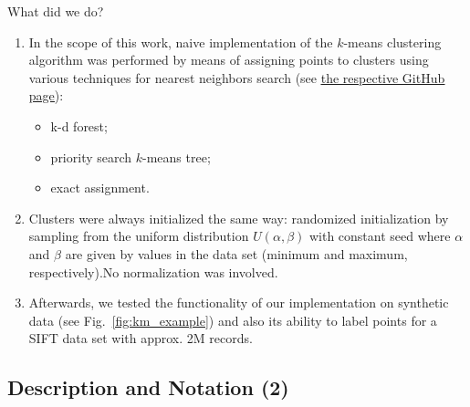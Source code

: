 \begin{frame}
	
	\begin{block}{What did we do?}
		\begin{enumerate}
			\item In the scope of this work, naive implementation of the $k$-means \cite{Lloyd1982} clustering algorithm was performed by means of assigning points to clusters using various techniques for nearest neighbors search (see \href{https://github.com/salisaresama/computer-vision/blob/flann-32k/pylib/ann/cluster.py}{{\color{blue} \underline{the respective GitHub page}}}):
			\begin{itemize}
				\item k-d forest;
				\item priority search $k$-means tree;
				\item exact assignment.
			\end{itemize}
			
			\item Clusters were always initialized the same way: randomized initialization by sampling from the uniform distribution $U(\alpha, \beta)$ with constant seed where $\alpha$ and $\beta$ are given by values in the data set (minimum and maximum, respectively).\footnotemark No normalization was involved.
			
			\item Afterwards, we tested the functionality of our implementation on synthetic data (see Fig.~\ref{fig:km_example}) and also its ability to label points for a SIFT data set with approx. 2M records.
		\end{enumerate}	

	\end{block}	

	
\end{frame}

\subsection{Description and Notation (2)}

